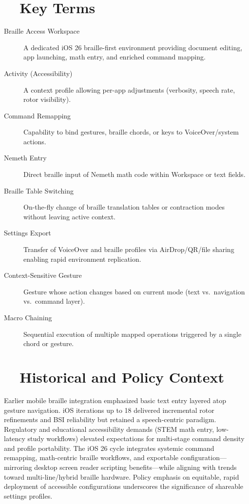 \section{~~Key Terms}
\label{sec:sr30-key-terms}
\begin{description}
	\item[Braille Access Workspace] A dedicated iOS 26 braille-first environment providing document editing, app launching, math entry, and enriched command mapping\supercite{myvision2025}.
	\item[Activity (Accessibility)] A context profile allowing per-app adjustments (verbosity, speech rate, rotor visibility)\supercite{applevisVO2024}.
	\item[Command Remapping] Capability to bind gestures, braille chords, or  keys to VoiceOver/system actions\supercite{hks2025}.
	\item[Nemeth Entry] Direct braille input of Nemeth math code within Workspace or text fields\supercite{appleSupportBSI2025}.
	\item[Braille Table Switching] On-the-fly change of braille translation tables or contraction modes without leaving active context.
	\item[Settings Export] Transfer of VoiceOver and braille profiles via AirDrop/QR/file sharing enabling rapid environment replication\supercite{myvision2025}.
	\item[Context-Sensitive Gesture] Gesture whose action changes based on current mode (text vs.\ navigation vs.\ command layer).
	\item[Macro Chaining] Sequential execution of multiple mapped operations triggered by a single chord or gesture.
\end{description}

\section{~~Historical and Policy Context}
\label{sec:sr30-history}
Earlier mobile braille integration emphasized basic text entry layered atop gesture navigation. iOS iterations up to 18 delivered incremental rotor refinements and BSI reliability but retained a speech-centric paradigm. Regulatory and educational accessibility demands (STEM math entry, low-latency study workflows) elevated expectations for multi-stage command density and profile portability. The iOS 26 cycle integrates systemic command remapping, math-centric braille workflows, and exportable configuration—mirroring desktop screen reader scripting benefits—while aligning with trends toward multi-line/hybrid braille hardware\supercite{nelowvision2025, myvision2025}. Policy emphasis on equitable, rapid deployment of accessible configurations underscores the significance of shareable settings profiles.

